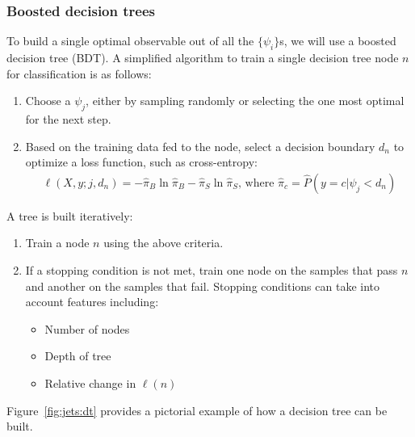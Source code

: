 \subsubsection{Boosted decision trees}
To build a single optimal observable out of all the $\{\psi_i\}$s, we will use a boosted decision tree (BDT).
A simplified algorithm to train a single decision tree node $n$ for classification is as follows:
\begin{enumerate}
    \item Choose a $\psi_j$, either by sampling randomly or selecting the one most optimal for the next step.
    \item Based on the training data fed to the node, select a decision boundary $d_n$ to optimize a loss function, such as cross-entropy:
        \begin{gather}
            \ell(X,y;j,d_n) =  -\hat\pi_B\ln\hat\pi_B -\hat\pi_S\ln\hat\pi_S \text{, where } 
            \hat\pi_c = \hat P(y=c | \psi_j < d_n) 
        \end{gather}
\end{enumerate}
A tree is built iteratively:
\begin{enumerate}
    \item Train a node $n$ using the above criteria. 
    \item If a stopping condition is not met, train one node on the samples that pass $n$ and another on the samples that fail.
          Stopping conditions can take into account features including:
    \begin{itemize}
            \item Number of nodes
            \item Depth of tree
            \item Relative change in $\ell(n)$
    \end{itemize}
\end{enumerate}
Figure~\ref{fig:jets:dt} provides a pictorial example of how a decision tree can be built. 

